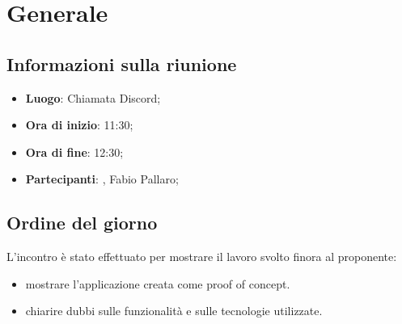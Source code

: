 \section{Generale}

\vspace{10pt}


\subsection{Informazioni sulla riunione}
\begin{itemize}
	\item \textbf{Luogo}: Chiamata Discord;
	\item \textbf{Ora di inizio}: 11:30;
	\item \textbf{Ora di fine}: 12:30;
	\item \textbf{Partecipanti}: \team, Fabio Pallaro;
\end{itemize}

\vspace{5pt}

\subsection{Ordine del giorno}
L'incontro è stato effettuato per mostrare il lavoro svolto finora al proponente:
\begin{itemize}
	\item mostrare l'applicazione creata come proof of concept.
	\item chiarire dubbi sulle funzionalità e sulle tecnologie utilizzate.
\end{itemize}
